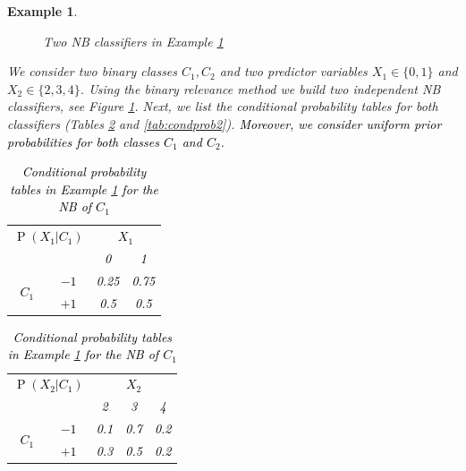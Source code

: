 \documentclass[11pt,a4paper, twoside]{book}
\newtheorem{example}{Example}[chapter]
\newcommand{\Pp}{\operatorname{P}}
\begin{document}
\begin{example}
\label{exp:ml1}
\begin{figure}
\centering
{}  
\caption{Two NB classifiers in Example \ref{exp:ml1}}
\label{fig:NBbrm}
\end{figure}
We consider two binary classes $C_1,C_2$ and two predictor variables $X_1 \in \{0,1\}$ and $X_2 \in \{2,3,4\}$.
Using the binary relevance method we build two independent NB classifiers, see Figure \ref{fig:NBbrm}.
Next, we list the conditional probability tables for both classifiers (Tables \ref{tab:condprob1ml} and \ref{tab:condprob2}). \textcolor{black}{Moreover, we consider uniform prior probabilities for both classes $C_1$ and $C_2$.}


\begin{table}
\caption{Conditional probability tables in Example \ref{exp:ml1} for the NB of $C_1$}
\centering
\label{tab:condprob1ml}
\begin{subtable}{0.4\textwidth}
\textcolor{black}{
\begin{tabular}{cccc}
\toprule
\multicolumn{2}{c}{$\Pp(X_1|C_1)$}  &  \multicolumn{2}{c}{$X_1$}\\
&  &  0    &   1 \\
\cmidrule{3-4}
\multirow{2}{0.5cm}{$C_1$} 
 & $-1$ & 0.25 & 0.75 \\
 & $+1$ & 0.5 & 0.5 \\
 \bottomrule
\end{tabular}}
\end{subtable}
\begin{subtable}{0.4\textwidth}
\textcolor{black}{\begin{tabular}{ccccc}
\toprule
\multicolumn{2}{c}{$\Pp(X_2|C_1)$}  &  \multicolumn{3}{c}{$X_2$}\\
&  &  2    &   3  & 4 \\
\cmidrule{3-5}
\multirow{2}{0.5cm}{$C_1$} 
 & $-1$ & 0.1 & 0.7 & 0.2 \\
 & $+1$ & 0.3 & 0.5 & 0.2 \\
 \bottomrule
\end{tabular}}
\end{subtable}
\end{table}



\end{example}
\end{document}

